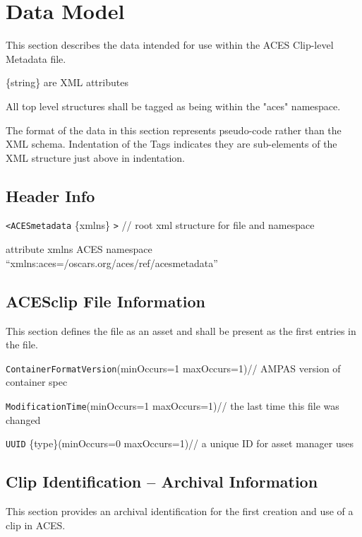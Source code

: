 \regularsectionformat	%

\newcommand{\xmlfield}[3]{
	\TabPositions{2em,1.75in,2.5in,2.6in}
	\tab\texttt{#1} \tab#2 \tab// #3	 \par
}


\chapter{Data Model}

This section describes the data intended for use within the ACES Clip-level Metadata file.

	\tabto{0.3in}\{string\} are XML attributes

All top level structures shall be tagged as being within the "aces" namespace.

The format of the data in this section represents pseudo-code rather than the XML schema. Indentation of the Tags indicates they are sub-elements of the XML structure just above in indentation.

\section{Header Info}
\texttt{<ACESmetadata} \{xmlns\} \texttt{>} \tabto{2.5in}// root xml structure for file and namespace

	\tabto{2em}attribute \hspace{2em} xmlns \hspace{2em} ACES namespace ``xmlns:aces=/oscars.org/aces/ref/acesmetadata''

\section{ACESclip File Information}
This section defines the file as an asset and shall be present as the first entries in the file.

	\TabPositions{2em,2.2in,4in}
	\tab\texttt{ContainerFormatVersion}\tab(minOccurs=1 maxOccurs=1)\tab// AMPAS version of container spec

	\tab\texttt{ModificationTime}\tab(minOccurs=1 maxOccurs=1)\tab// the last time this file was changed

	\tab\texttt{UUID} \{type\}\tab(minOccurs=0 maxOccurs=1)\tab// a unique ID for asset manager uses

\section{Clip Identification -- Archival Information}
This section provides an archival identification for the first creation and use of a clip in ACES.

